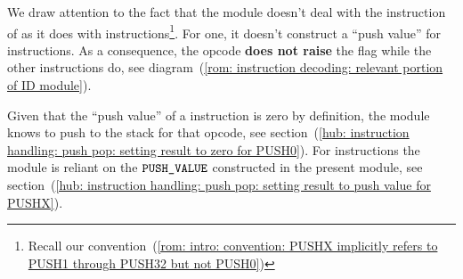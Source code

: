\saNote{}
\label{rom: columns: IS_PUSH_FLAG does not light up for PUSH0}
We draw attention to the fact that the \romMod{} module
doesn't deal with the  instruction of \cite{EIP-3855} as it does with
 instructions\footnote{Recall our convention~(\ref{rom: intro: convention: PUSHX implicitly refers to PUSH1 through PUSH32 but not PUSH0})}.
For one, it doesn't construct a ``push value'' for  instructions.
As a consequence, the  opcode \textbf{does not raise} the \IP{} flag while the other  instructions do,
see diagram~(\ref{rom: instruction decoding: relevant portion of ID module}).

\saNote{}
\label{rom: columns: push values for PUSH0 vs PUSHX in the HUB}
Given that the ``push value'' of a  instruction is zero by definition,
the \hubMod{} module knows to push  to the stack for that opcode,
see section~(\ref{hub: instruction handling: push pop: setting result to zero for PUSH0}).
For  instructions the \hubMod{} module is reliant on the $\texttt{PUSH\_VALUE}$ constructed in the present module,
see section~(\ref{hub: instruction handling: push pop: setting result to push value for PUSHX}).
